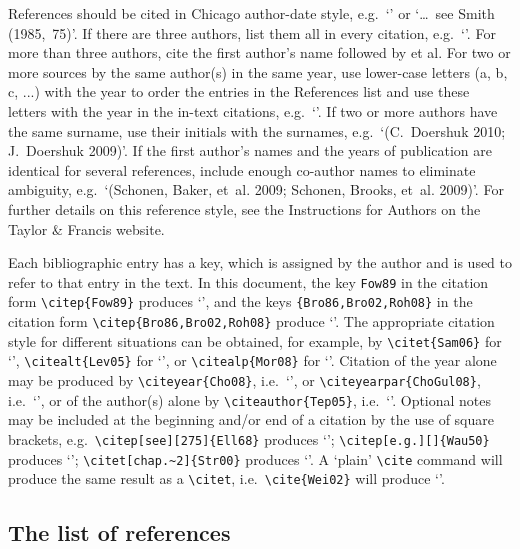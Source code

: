\documentclass[]{interact}
\theoremstyle{plain}%
\theoremstyle{definition}
\theoremstyle{remark}
\begin{document}
References should be cited in Chicago author-date style, e.g.\ `\citep{Alb05,Gre08,Sch87}' or `\ldots~see Smith (1985,~75)'. If there are three authors, list them all in every citation, e.g.\ `\citep{JTL97}'. For more than three authors, cite the first author's name followed by et al. For two or more sources by the same author(s) in the same year, use lower-case letters (a, b, c, ...) with the year to order the entries in the References list and use these letters with the year in the in-text citations, e.g.\ `\citep{FogEHPD04,FogJEE04}'. If two or more authors have the same surname, use their initials with the surnames, e.g.\ `(C.~Doershuk 2010; J.~Doershuk 2009)'. If the first author's names and the years of publication are identical for several references, include enough co-author names to eliminate ambiguity, e.g.\ `(Schonen, Baker, et~al. 2009; Schonen, Brooks, et~al. 2009)'. For further details on this reference style, see the Instructions for Authors on the Taylor \& Francis website.

Each bibliographic entry has a key, which is assigned by the author and is used to refer to that entry in the text. In this document, the key \verb"Fow89" in the citation form \verb"\citep{Fow89}" produces `\citep{Fow89}', and the keys \verb"{Bro86,Bro02,Roh08}" in the citation form \verb"\citep{Bro86,Bro02,Roh08}" produce `\citep{Bro86,Bro02,Roh08}'. The appropriate citation style for different situations can be obtained, for example, by \verb"\citet{Sam06}" for `\citet{Sam06}', \verb"\citealt{Lev05}" for `\citealt{Lev05}', or \verb"\citealp{Mor08}" for `\citealp{Mor08}'. Citation of the year alone may be produced by \verb"\citeyear{Cho08}", i.e.\ `\citeyear{Cho08}', or \verb"\citeyearpar{ChoGul08}", i.e.\ `\citeyearpar{ChoGul08}', or of the author(s) alone by \verb"\citeauthor{Tep05}", i.e.\ `\citeauthor{Tep05}'. Optional notes may be included at the beginning and/or end of a citation by the use of square brackets, e.g.\ \verb"\citep[see][275]{Ell68}" produces `\citep[see][275]{Ell68}'; \verb"\citep[e.g.][]{Wau50}" produces `\citep[e.g.][]{Wau50}'; \verb"\citet[chap.~2]{Str00}" produces `\citet[chap.~2]{Str00}'. A `plain' \verb"\cite" command will produce the same result as a \verb"\citet", i.e.\ \verb"\cite{Wei02}" will produce `\cite{Wei02}'.


\subsection{The list of references}
\end{document}
